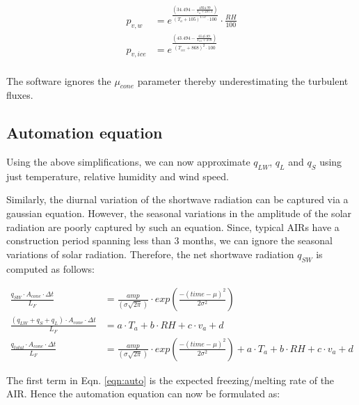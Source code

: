 \documentclass[utf8]{frontiersSCNS}
\begin{document}
\begin{equation}
	\begin{split}
		p_{v,w}&=e^{\frac{(34.494 - \frac{4924.99}{T_{a} + 237.1})}{(T_a + 105)^{1.57} \cdot 100}} \cdot \frac{RH}{100} \\
		p_{v,ice}&=e^{\frac{(43.494 - \frac{6545.89}{T_{ice} + 278})}{(T_{ice} + 868)^{2} \cdot 100}} \\
	\end{split} \label{eqn:vp}
\end{equation}

The software ignores the $\mu_{cone}$ parameter thereby underestimating the turbulent fluxes.

\subsection{Automation equation}
Using the above simplifications, we can now approximate $q_{LW}$, $q_{L}$ and $q_{S}$ using just temperature,
relative humidity and wind speed. 

Similarly, the diurnal variation of the shortwave radiation can be captured via a gaussian equation. However,
the seasonal variations in the amplitude of the solar radiation are poorly captured by such an equation. Since,
typical AIRs have a construction period spanning less than 3 months, we can ignore the seasonal variations of
solar radiation. Therefore, the net shortwave radiation $q_{SW}$ is computed as follows: 


\begin{subequations}

	\begin{align}
		\label{eqn:SW}
    \frac{q_{SW} \cdot A_{cone} \cdot \Delta t}{L_F} & = \frac{amp}{(\sigma \sqrt{2\pi})} \cdot
    exp\left(\frac{-(time-\mu)^2}{2\sigma^2}\right) \\
		\label{eqn:T}
    \frac{(q_{LW} + q_{S} + q_{L}) \cdot A_{cone} \cdot \Delta t}{L_F} & = a \cdot T_a + b \cdot RH + c \cdot v_a +
  d \\
		\label{eqn:auto}
    \frac{q_{total} \cdot A_{cone} \cdot \Delta t}{L_F} & = \frac{amp}{(\sigma \sqrt{2\pi})} \cdot
    exp\left(\frac{-(time-\mu)^2}{2\sigma^2}\right) + a \cdot T_a + b \cdot RH + c \cdot v_a + d
	\end{align}
\end{subequations}

The first term in Eqn. \ref{eqn:auto} is the expected freezing/melting rate of the AIR. Hence the automation
equation can now be formulated as:
\end{document}
